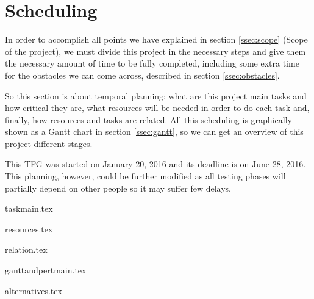 \section{Scheduling}
\label{sec:sched}
In order to accomplish all points we have explained in section \ref{ssec:scope} (Scope of the project), we must divide this project in the necessary steps and give them the necessary amount of time to be fully completed, including some extra time for the obstacles we can come across, described in section \ref{ssec:obstacles}. 

So this section is about temporal planning: what are this project main tasks and how critical they are, what resources will be needed in order to do each task and, finally, how resources and tasks are related. All this scheduling is graphically shown as a Gantt chart in section \ref{ssec:gantt}, so we can get an overview of this project different stages.

This TFG was started on January 20, 2016 and its deadline is on June 28, 2016. This planning, however, could be further modified as all testing phases will partially depend on other people so it may suffer few delays.

{taskmain.tex}

{resources.tex}

{relation.tex}

{ganttandpertmain.tex}


{alternatives.tex}